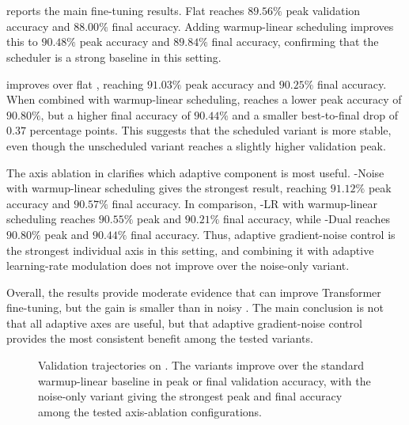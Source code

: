 \section{\sst{}}
\label{sec:results-sst2}



 reports the main \sst{} fine-tuning results. Flat \adamw{} reaches $89.56\%$ peak validation accuracy and $88.00\%$ final accuracy. Adding warmup-linear scheduling improves this to $90.48\%$ peak accuracy and $89.84\%$ final accuracy, confirming that the scheduler is a strong baseline in this setting.

\method{} improves over flat \adamw{}, reaching $91.03\%$ peak accuracy and $90.25\%$ final accuracy. When combined with warmup-linear scheduling, \method{} reaches a lower peak accuracy of $90.80\%$, but a higher final accuracy of $90.44\%$ and a smaller best-to-final drop of $0.37$ percentage points. This suggests that the scheduled variant is more stable, even though the unscheduled variant reaches a slightly higher validation peak.

The axis ablation in  clarifies which adaptive component is most useful. \method{}-Noise with warmup-linear scheduling gives the strongest result, reaching $91.12\%$ peak accuracy and $90.57\%$ final accuracy. In comparison, \method{}-LR with warmup-linear scheduling reaches $90.55\%$ peak and $90.21\%$ final accuracy, while \method{}-Dual reaches $90.80\%$ peak and $90.44\%$ final accuracy. Thus, adaptive gradient-noise control is the strongest individual axis in this setting, and combining it with adaptive learning-rate modulation does not improve over the noise-only variant.

Overall, the \sst{} results provide moderate evidence that \method{} can improve Transformer fine-tuning, but the gain is smaller than in noisy \agnews{}. The main conclusion is not that all adaptive axes are useful, but that adaptive gradient-noise control provides the most consistent benefit among the tested \method{} variants.

\begin{figure}[t]
    \centering
    \caption[
        Validation trajectories on \sst{}
    ]{
        Validation trajectories on \sst{}. The \method{} variants improve over the standard warmup-linear baseline in peak or final validation accuracy, with the noise-only variant giving the strongest peak and final accuracy among the tested axis-ablation configurations.
    }
    \label{fig:sst2-curves}
\end{figure}